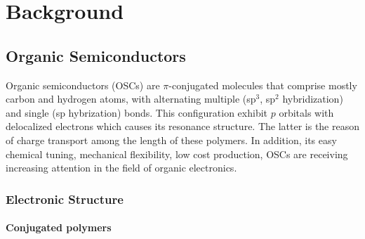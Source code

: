 {\chapter{Background}}
\label{sec:background}

\section{Organic Semiconductors}


Organic semiconductors (OSCs) are $\pi$-conjugated molecules that comprise mostly carbon and hydrogen atoms, with alternating multiple (sp$^{3}$, sp$^{2}$ hybridization) and single (sp hybrization) bonds. This configuration exhibit $p$ orbitals with delocalized electrons which causes its resonance structure. The latter is the reason of charge transport among the length of these polymers. In addition, its easy chemical tuning, mechanical flexibility, low cost production, OSCs are receiving increasing attention in the field of organic electronics.


\subsection{Electronic Structure}

\subsubsection{Conjugated polymers}

